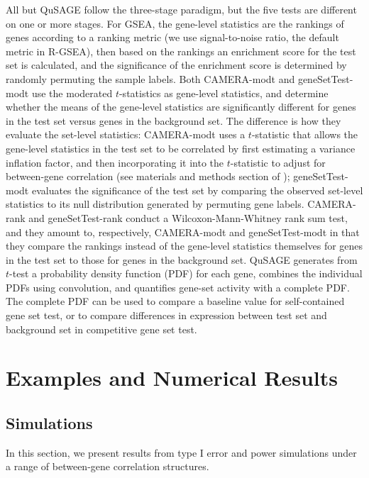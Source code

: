 \documentclass[11pt, a4paper]{article}
\begin{document}
	All but QuSAGE follow the three-stage paradigm, but the five tests are different on one or more stages. For GSEA, the gene-level statistics are the rankings of genes according to a ranking metric (we use signal-to-noise ratio, the default metric in R-GSEA), then based on the rankings an enrichment score for the test set is calculated, and the significance of the enrichment score is determined by randomly permuting the sample labels. Both CAMERA-modt and geneSetTest-modt use the moderated $t$-statistics \citep{Smyth2004moderated} as gene-level statistics, and determine whether the means of the gene-level statistics are significantly different for genes in the test set versus genes in the background set. The difference is how they evaluate the set-level statistics: CAMERA-modt uses a $t$-statistic that allows the gene-level statistics in the test set to be correlated by first estimating a variance inflation factor, and then incorporating it into the $t$-statistic to adjust for between-gene correlation (see materials and methods section of \cite{wu2012camera}); geneSetTest-modt evaluates the significance of the test set by comparing the observed set-level statistics to its null distribution generated by permuting gene labels. CAMERA-rank and geneSetTest-rank conduct a Wilcoxon-Mann-Whitney rank sum test, and they amount to, respectively,  CAMERA-modt and geneSetTest-modt in that they compare the rankings instead of the gene-level statistics themselves for genes in the test set to those for genes in the background set. QuSAGE generates from $t$-test a probability density function (PDF) for each gene, combines the individual PDFs using convolution, and quantifies gene-set activity with a complete PDF. The complete PDF can be used to compare a baseline value for self-contained gene set test, or to compare differences in expression between test set and background set in competitive gene set test.  
	

	
	\section{Examples and Numerical Results}\label{section:results}

	\subsection{Simulations}\label{subsection:simulation}
		In this section, we present results from type I error and power simulations under a range of between-gene correlation structures.
		
\end{document}
